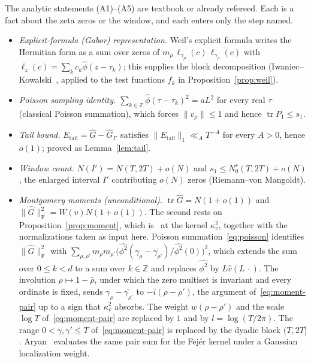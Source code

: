 \documentclass[11pt]{article}
\theoremstyle{definition}
\DeclareMathOperator{\tr}{tr}
\newcommand{\Z}{\mathbb{Z}}
\newcommand{\F}{\mathrm{F}}
\begin{document}
The analytic statements (A1)--(A5) are textbook or already refereed. Each is a
fact about the zeta zeros or the window, and each enters only the step named.
\begin{itemize}
\item[(A1)] \emph{Explicit-formula (Gabor) representation.} Weil's explicit formula
writes the Hermitian form as a sum over zeros of
$m_\rho\,\ell_{\gamma_\rho}(c)\,\overline{\ell_{\overline{\gamma_\rho}}(c)}$ with
$\ell_z(c)=\sum_k c_k\widehat\phi(z-\tau_k)$; this supplies the block
decomposition (Iwaniec--Kowalski~\cite[Theorem~5.11]{IK04}, applied to the test
functions $f_k$ in Proposition~\ref{prop:weil}).
\item[(A2)] \emph{Poisson sampling identity.}
$\sum_{k\in\Z}\widehat\phi(\tau-\tau_k)^2=aL^2$ for every real $\tau$ (classical
Poisson summation), which forces $\|v_\rho\|\le1$ and hence $\tr P_1\le s_1$.
\item[(A3)] \emph{Tail bound.} $E_{\mathrm{tail}}=\widehat G-\widehat G_{I'}$
satisfies $\|E_{\mathrm{tail}}\|_1\ll_A T^{-A}$ for every $A>0$, hence $o(1)$;
proved as Lemma~\ref{lem:tail}.
\item[(A4)] \emph{Window count.} $N(I')=N(T,2T)+o(N)$ and
$s_1\le N_0^s(T,2T)+o(N)$, the enlarged interval $I'$ contributing $o(N)$ zeros
(Riemann--von Mangoldt).
\item[(A5)] \emph{Montgomery moments (unconditional).} $\tr\widehat G=N(1+o(1))$
and $\|\widehat G\|_{\F}^2=W(v)N(1+o(1))$. The second rests on
Proposition~\ref{prop:moment}, which is~\cite[Lemma~5]{BGSTB24} at the kernel
$\kappa_v^2$, together with the normalizations taken as input here.
Poisson summation~\eqref{eq:poisson} identifies $\|\widehat G\|_{\F}^2$ with
$\sum_{\rho,\rho'}m_\rho m_{\rho'}\big(\widehat{\phi^2}(\gamma_\rho-\overline{\gamma_{\rho'}})/\widehat{\phi^2}(0)\big)^2$,
which extends the sum over $0\le k<d$ to a sum over $k\in\Z$ and replaces
$\widehat{\phi^2}$ by $L\widehat v(L\,\cdot)$. The involution $\rho\mapsto1-\bar\rho$,
under which the zero multiset is invariant and every ordinate is fixed, sends
$\gamma_\rho-\overline{\gamma_{\rho'}}$ to $-i(\rho-\rho')$, the argument
of~\eqref{eq:moment-pair} up to a sign that $\kappa_v^2$ absorbs. The weight
$w(\rho-\rho')$ and the scale $\log T$ of~\eqref{eq:moment-pair} are replaced by
$1$ and by $l=\log(T/2\pi)$. The range $0<\gamma,\gamma'\le T$
of~\eqref{eq:moment-pair} is replaced by the dyadic block $(T,2T]$.
Aryan~\cite{Aryan22} evaluates the same pair sum for the Fej\'er kernel under a
Gaussian localization weight.
\end{itemize}
\end{document}
